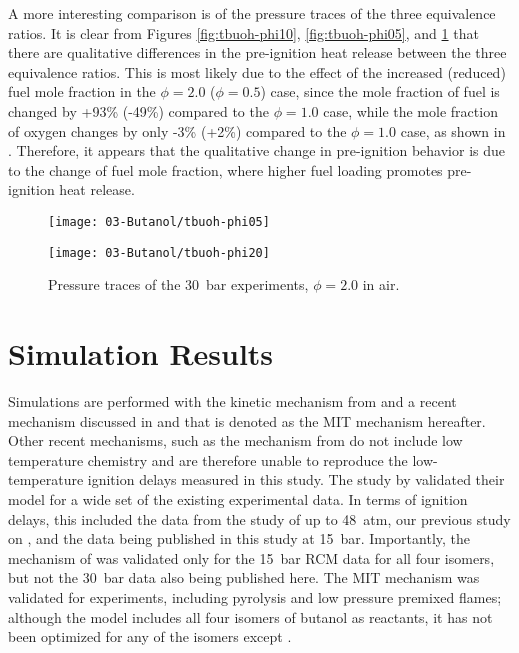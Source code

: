 \documentclass[12pt, letterpaper]{article}
\begin{document}
A more interesting comparison is of the pressure traces of the three
equivalence ratios. It is clear from Figures \ref{fig:tbuoh-phi10},
\ref{fig:tbuoh-phi05}, and \ref{fig:tbuoh-phi20} that there are qualitative
differences in the pre-ignition heat release between the three equivalence
ratios. This is most likely due to the effect of the increased (reduced) fuel
mole fraction in the $\phi=\num{2.0}$ ($\phi=\num{0.5}$) case, since the mole fraction of
fuel is changed by +93\% (-49\%) compared to the $\phi=\num{1.0}$ case, while the
mole fraction of oxygen changes by only -3\% (+2\%) compared to the $\phi=\num{1.0}$
case, as shown in . Therefore, it appears that the
qualitative change in pre-ignition behavior is due to the change of fuel mole
fraction, where higher fuel loading promotes pre-ignition heat release.

\begin{figure}
    \begin{floatrow}
    \ffigbox
        {\texttt{[image: 03-Butanol/tbuoh-phi05]}}
        {\caption{Pressure traces of the \SI{30}{\bar} \tBuOH{} experiments,
            $\phi=\num{0.5}$ in air.}
        \label{fig:tbuoh-phi05}}
    \ffigbox
        {\texttt{[image: 03-Butanol/tbuoh-phi20]}}
        {\caption{Pressure traces of the \SI{30}{\bar} \tBuOH{} experiments,
            $\phi=\num{2.0}$ in air.}
        \label{fig:tbuoh-phi20}}
    \end{floatrow}
\end{figure}

\section{Simulation Results}
\label{sec:buoh-sims}

Simulations are performed with the kinetic mechanism from
\textcite{Sarathy2012} and a recent mechanism discussed in
\textcite{Hansen2013} and \textcite{Merchant2013} that is denoted as the MIT
mechanism hereafter. Other recent mechanisms, such as the mechanism from
\textcite{Frassoldati2012} do not include low temperature chemistry and are
therefore unable to reproduce the low-temperature ignition delays measured in
this study. The study by \textcite{Sarathy2012} validated their model for a
wide set of the existing experimental data. In terms of ignition delays, this
included the data from the study of \textcite{Stranic2012} up to \SI{48}{atm}, our
previous study on \nBuOH{} \cite{Weber2011}, and the data being
published in this study at \SI{15}{\bar}. Importantly, the mechanism of
\textcite{Sarathy2012} was validated only for the \SI{15}{\bar} RCM data for all four
isomers, but not the \SI{30}{\bar} data also being published here. The MIT mechanism
\cite{Hansen2013,Merchant2013} was validated for \iBuOH{}
experiments, including pyrolysis and low pressure premixed flames; although the
model includes all four isomers of butanol as reactants, it has not been
optimized for any of the isomers except \iBuOH{}.
\end{document}
